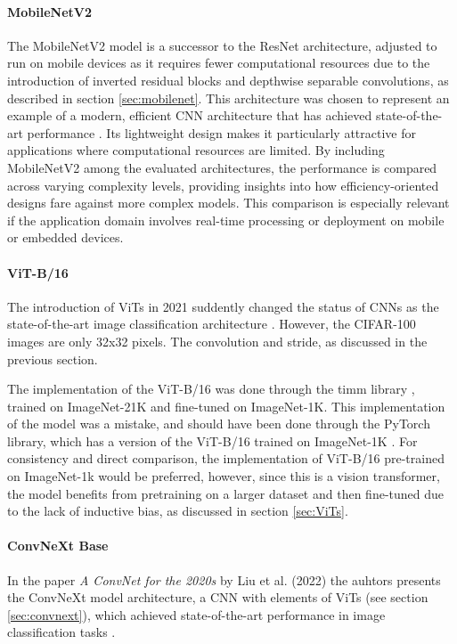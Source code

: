 \paragraph{MobileNetV2}
The MobileNetV2 model  is a successor to the ResNet architecture, adjusted to run on mobile devices as it requires fewer computational resources due to the introduction of inverted residual blocks and depthwise separable convolutions, as described in section \ref{sec:mobilenet}. This architecture was chosen to represent an example of a modern, efficient CNN architecture that has achieved state-of-the-art performance . Its lightweight design makes it particularly attractive for applications where computational resources are limited. By including MobileNetV2 among the evaluated architectures, the performance is compared across varying complexity levels, providing insights into how efficiency-oriented designs fare against more complex models. This comparison is especially relevant if the application domain involves real-time processing or deployment on mobile or embedded devices.




    

\paragraph{ViT-B/16}
The introduction of ViTs in 2021 \cite{dosovitskiy2021imageworth16x16words} suddently changed the status of CNNs as the state-of-the-art image classification architecture \cite{liu2022convnet2020s}. However, the CIFAR-100 images are only 32x32 pixels. The convolution and stride, as discussed in the previous section.

The implementation of the ViT-B/16 was done through the timm library \cite{huggingface2024vitbase}, trained on ImageNet-21K and fine-tuned on ImageNet-1K. This implementation of the model was a mistake, and should have been done through the PyTorch library, which has a version of the ViT-B/16 trained on ImageNet-1K \cite{torchvision2024vitb16}. For consistency and direct comparison, the implementation of ViT-B/16 pre-trained on ImageNet-1k would be preferred, however, since this is a vision transformer, the model benefits from pretraining on a larger dataset and then fine-tuned due to the lack of inductive bias, as discussed in section \ref{sec:ViTs}.




\paragraph{ConvNeXt Base}
In the paper \emph{A ConvNet for the 2020s} by Liu et al. (2022) \cite{liu2022convnet2020s} the auhtors presents the ConvNeXt model architecture, a CNN with elements of ViTs (see section \ref{sec:convnext}), which achieved state-of-the-art performance in image classification tasks . 


